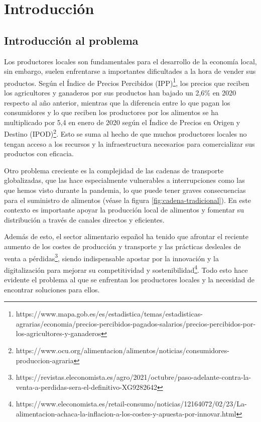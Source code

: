 
\chapter{Introducción}\label{cap1} %

\section{Introducción al problema}\label{sec:intro}

Los productores locales son fundamentales para el desarrollo de la economía local, sin embargo, suelen enfrentarse a importantes dificultades a la hora de vender sus productos. Según el Índice de Precios Percibidos (IPP)\footnote{https://www.mapa.gob.es/es/estadistica/temas/estadisticas-agrarias/economia/precios-percibidos-pagados-salarios/precios-percibidos-por-los-agricultores-y-ganaderos}, los precios que reciben los agricultores y ganaderos por sus productos han bajado un 2,6\% en 2020 respecto al año anterior, mientras que la diferencia entre lo que pagan los consumidores y lo que reciben los productores por los alimentos se ha multiplicado por 5,4 en enero de 2020 según el Índice de Precios en Origen y Destino (IPOD)\footnote{https://www.ocu.org/alimentacion/alimentos/noticias/consumidores-produccion-agraria}. Esto se suma al hecho de que muchos productores locales no tengan acceso a los recursos y la infraestructura necesarios para comercializar sus productos con eficacia.

Otro problema creciente es la complejidad de las cadenas de transporte globalizadas, que las hace especialmente vulnerables a interrupciones como las que hemos visto durante la pandemia, lo que puede tener graves consecuencias para el suministro de alimentos (véase la figura \ref{fig:cadena-tradicional}). En este contexto es importante apoyar la producción local de alimentos y fomentar su distribución a través de canales directos y eficientes.

Además de esto, el sector alimentario español ha tenido que afrontar el reciente aumento de los costes de producción y transporte y las prácticas desleales de venta a pérdidas\footnote{https://revistas.eleconomista.es/agro/2021/octubre/paso-adelante-contra-la-venta-a-perdidas-sera-el-definitivo-XG9282642}, siendo indispensable apostar por la innovación y la digitalización para mejorar su competitividad y sostenibilidad\footnote{https://www.eleconomista.es/retail-consumo/noticias/12164072/02/23/La-alimentacion-achaca-la-inflacion-a-los-costes-y-apuesta-por-innovar.html}. Todo esto hace evidente el problema al que se enfrentan los productores locales y la necesidad de encontrar soluciones para ellos.

